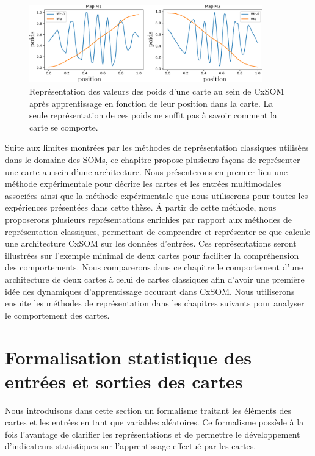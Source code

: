 \documentclass[../main]{subfiles}
\begin{document}
\begin{figure}
\centering
\includegraphics[width=0.9\textwidth]{weights_cercle1.pdf}

\caption{Représentation des valeurs des poids d'une carte au sein de CxSOM après apprentissage en fonction de leur position dans la carte. La seule représentation de ces poids ne suffit pas à savoir comment la carte se comporte.\label{fig:weights}}
\end{figure}

Suite aux limites montrées par les méthodes de représentation classiques utilisées dans le domaine des SOMs, ce chapitre propose plusieurs façons de représenter une carte au sein d'une architecture.
Nous présenterons en premier lieu une méthode expérimentale pour décrire les cartes et les entrées multimodales associées ainsi que la méthode expérimentale que nous utiliserons pour toutes les expériences présentées dans cette thèse. 
\'A partir de cette méthode, nous proposerons plusieurs représentations enrichies par rapport aux méthodes de représentation classiques, permettant de comprendre et représenter ce que calcule une architecture CxSOM sur les données d'entrées. Ces représentations seront illustrées sur l'exemple minimal de deux cartes pour faciliter la compréhension des comportements. Nous comparerons dans ce chapitre le comportement d'une architecture de deux cartes à celui de cartes classiques afin d'avoir une première idée des dynamiques d'apprentissage occurant dans CxSOM.
Nous utiliserons ensuite les méthodes de représentation dans les chapitres suivants pour analyser le comportement des cartes.

\section{Formalisation statistique des entrées et sorties des cartes}

Nous introduisons dans cette section un formalisme traitant les éléments des cartes et les entrées en tant que variables aléatoires. 
Ce formalisme possède à la fois l'avantage de clarifier les représentations et de permettre le développement d'indicateurs statistiques sur l'apprentissage effectué par les cartes.
\end{document}
